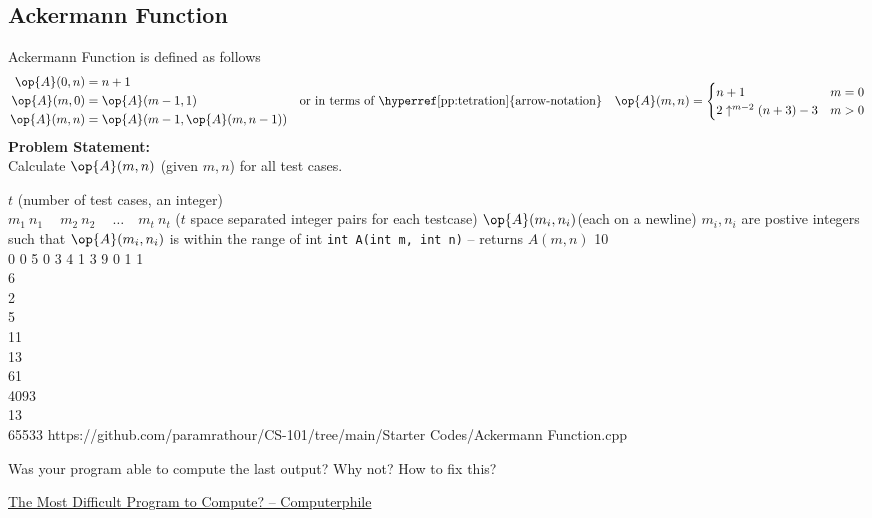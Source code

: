\documentclass[../../Problems]{subfiles}
\begin{document}
\subsection{Ackermann Function}
Ackermann Function is defined as follows
\begin{equation}
	\begin{aligned}
		\op{A}(0,n)&=n+1\\
		\op{A}(m,0)&=\op{A}(m-1,1)\\
		\op{A}(m,n)&=\op{A}(m-1,\op{A}(m,n-1))
	\end{aligned} \quad\text{or in terms of \hyperref[pp:tetration]{arrow-notation}}\quad
		\begin{aligned}
		\op{A}(m,n) =
			\begin{cases}n+1&m=0\\
			2\uparrow ^{m-2}(n+3)-3&m>0
			\end{cases}
	\end{aligned}
\end{equation}
\textbf{Problem Statement:}\\
Calculate $\op{A}(m,n)$ (given $m,n$) for all test cases.
\begin{testcasesFunction}
	{$t$ \hfill(number of test cases, an integer)\\
	$m_1\ n_1\ \quad m_2\ n_2\ \quad \ldots\quad m_t\ n_t$ \hfill($t$ space separated integer pairs for each testcase)}
	{$\op{A}(m_i,n_i)$\hfill(each on a newline)}
	{$m_i,n_i$ are postive integers such that $\op{A}(m_i,n_i)$ is within the range of int}
	{\texttt{int A(int m, int n)} -- returns $A(m,n)$}
	{10\\0 0 5 0 3 4 1 3 9 0 1}
	{1\\6\\2\\5\\11\\13\\61\\4093\\13\\65533}
	{https://github.com/paramrathour/CS-101/tree/main/Starter Codes/Ackermann Function.cpp}
\end{testcasesFunction}
\begin{noteI}
	Was your program able to compute the last output? Why not? How to fix this?
\end{noteI}
\begin{funvideo}
\href{https://youtu.be/i7sm9dzFtEI}{The Most Difficult Program to Compute? -- Computerphile}
\end{funvideo}
\end{document}
